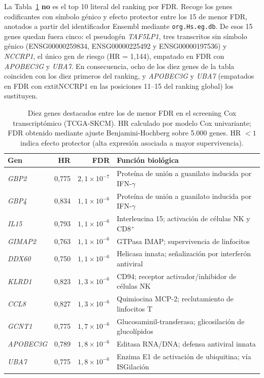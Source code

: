 La Tabla~\ref{tab:top_genes_tcga} \textbf{no} es el top 10 literal del ranking por FDR. Recoge los genes codificantes con símbolo génico y efecto protector entre los 15 de menor FDR, anotados a partir del identificador Ensembl mediante \texttt{org.Hs.eg.db}. De esos 15 genes quedan fuera cinco: el pseudogén \textit{TAF5LP1}, tres transcritos sin símbolo génico (ENSG00000259834, ENSG00000225492 y ENSG00000197536) y \textit{NCCRP1}, el único gen de riesgo (HR = 1{,}144), empatado en FDR con \textit{APOBEC3G} y \textit{UBA7}. En consecuencia, ocho de los diez genes de la tabla coinciden con los diez primeros del ranking, y \textit{APOBEC3G} y \textit{UBA7} (empatados en FDR con 	extit{NCCRP1} en las posiciones 11--15 del ranking global) los sustituyen.

\begin{table}[H]
\centering
\caption{Diez genes destacados entre los de menor FDR en el screening Cox transcriptómico (TCGA-SKCM). HR calculado por modelo Cox univariante; FDR obtenido mediante ajuste Benjamini-Hochberg sobre 5.000 genes. HR $< 1$ indica efecto protector (alta expresión asociada a mayor supervivencia).}
\label{tab:top_genes_tcga}
\begin{tabularx}{\textwidth}{l r r X}
\toprule
Gen & HR & FDR & Función biológica \\
\midrule
\textit{GBP2}     & 0,775 & $2{,}1\times10^{-7}$ & Proteína de unión a guanilato inducida por IFN-$\gamma$ \\
\textit{GBP4}     & 0,834 & $1{,}1\times10^{-6}$ & Proteína de unión a guanilato inducida por IFN-$\gamma$ \\
\textit{IL15}     & 0,793 & $1{,}1\times10^{-6}$ & Interleucina 15; activación de células NK y CD8$^+$ \\
\textit{GIMAP2}   & 0,763 & $1{,}1\times10^{-6}$ & GTPasa IMAP; supervivencia de linfocitos \\
\textit{DDX60}    & 0,750 & $1{,}1\times10^{-6}$ & Helicasa innata; señalización por interferón antiviral \\
\textit{KLRD1}    & 0,823 & $1{,}3\times10^{-6}$ & CD94; receptor activador/inhibidor de células NK \\
\textit{CCL8}     & 0,827 & $1{,}3\times10^{-6}$ & Quimiocina MCP-2; reclutamiento de linfocitos T \\
\textit{GCNT1}    & 0,775 & $1{,}7\times10^{-6}$ & Glucosaminil-transferasa; glicosilación de glucolípidos \\
\textit{APOBEC3G} & 0,789 & $1{,}8\times10^{-6}$ & Editasa RNA/DNA; defensa antiviral innata \\
\textit{UBA7}     & 0,775 & $1{,}8\times10^{-6}$ & Enzima E1 de activación de ubiquitina; vía ISGilación \\
\bottomrule
\end{tabularx}
\end{table}

